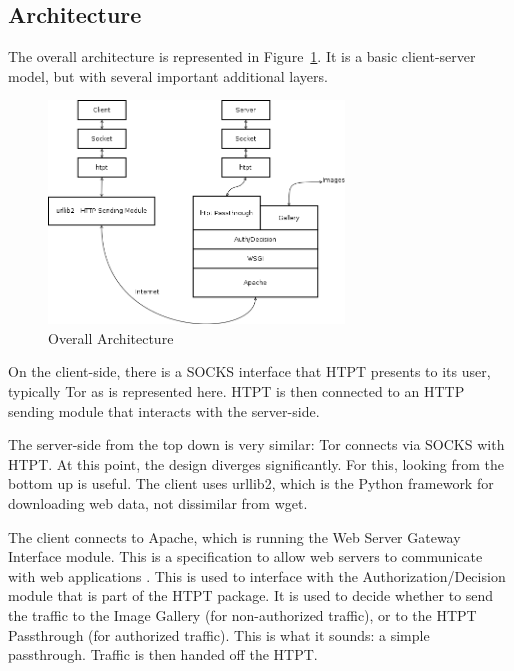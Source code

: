 \subsection{Architecture}
The overall architecture is represented in Figure~\ref{fig:overall_arch}. It is a basic client-server model, but with several important additional layers.

\begin{figure}[t]
\centering
\includegraphics[width=0.7\textwidth]{Overall_architecture}
\caption{Overall Architecture}
\label{fig:overall_arch}
\end{figure}

On the client-side, there is a SOCKS interface that HTPT presents to its user, typically Tor as is represented here. HTPT is then connected to an HTTP sending module that interacts with the server-side.

The server-side from the top down is very similar: Tor connects via SOCKS with HTPT. At this point, the design diverges significantly. For this, looking from the bottom up is useful. 
The client uses urllib2, which is the Python framework for downloading web data, not dissimilar from wget.

The client connects to Apache, which is running the Web Server Gateway Interface module. This is a specification to allow web servers to communicate with web applications \cite{Ref16}. This is used to interface with the Authorization/Decision module that is part of the HTPT package. It is used to decide whether to send the traffic to the Image Gallery (for non-authorized traffic), or to the HTPT Passthrough (for authorized traffic). This is what it sounds: a simple passthrough. Traffic is then handed off the HTPT. 

